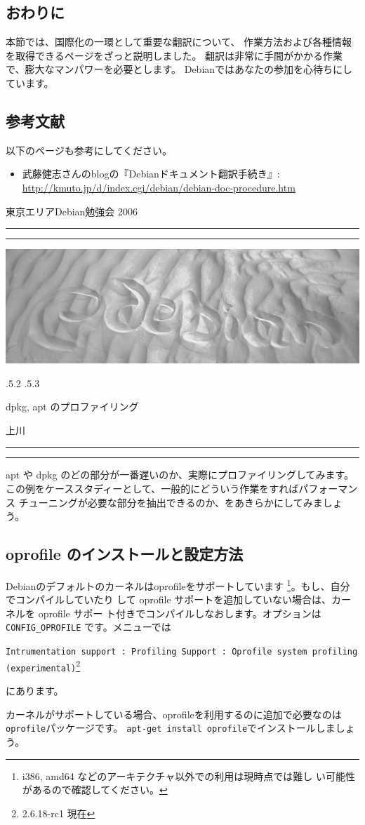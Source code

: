 \documentclass[mingoth,a4paper]{jsarticle}
\makeatletter
\renewcommand{\section}{\@startsection{section}{1}{\z@}%
    {\Cvs \@plus.5\Cdp \@minus.2\Cdp}%
    {.5\Cvs \@plus.3\Cdp}%
    {\normalfont\Huge\headfont\raggedright\centering}} %
\newcommand{\dancersection}[2]{%
\newpage
東京エリアDebian勉強会 2006
\hrule
\vspace{0.5mm}
\hrule
\hfill{}\includegraphics[width=16cm]{image2006-natsu/guruguru-sand-light.png}\\
\vspace{-5cm}
\begin{center}
\section{#1}
\end{center}
\hfill{}\colorbox{white}{#2}\hspace{3cm}\space\\
\vspace{1cm}
\hrule
\vspace{0.5mm}
\hrule
\vspace{1cm}
}
\makeatother
\begin{document}
\subsection{おわりに}

本節では、国際化の一環として重要な翻訳について、
作業方法および各種情報を取得できるページをざっと説明しました。
翻訳は非常に手間がかかる作業で、膨大なマンパワーを必要とします。
Debianではあなたの参加を心待ちにしています。

\subsection{参考文献}

以下のページも参考にしてください。

\begin{itemize}
 \item 武藤健志さんのblogの『Debianドキュメント翻訳手続き』:
       \url{http://kmuto.jp/d/index.cgi/debian/debian-doc-procedure.htm}
\end{itemize}


\dancersection{dpkg, apt のプロファイリング}{上川}
\label{sec:dancerjapt}

apt や dpkg のどの部分が一番遅いのか、実際にプロファイリングしてみます。
この例をケーススタディーとして、一般的にどういう作業をすればパフォーマンス
チューニングが必要な部分を抽出できるのか、をあきらかにしてみましょう。

\subsection{oprofile のインストールと設定方法}

Debianのデフォルトのカーネルはoprofileをサポートしています
\footnote{i386, amd64 などのアーキテクチャ以外での利用は現時点では難し
い可能性があるので確認してください。}。もし、自分でコンパイルしていたり
して oprofile サポートを追加していない場合は、カーネルを oprofile サポー
ト付きでコンパイルしなおします。オプションは \texttt{CONFIG\_OPROFILE}
です。メニューでは

\texttt{Intrumentation support : Profiling Support :
Oprofile system profiling (experimental)}\footnote{2.6.18-rc1 現在}

にあります。

カーネルがサポートしている場合、oprofileを利用するのに追加で必要なのは
\texttt{oprofile}パッケージです。
\texttt{apt-get install oprofile}でインストールしましょう。
\end{document}
